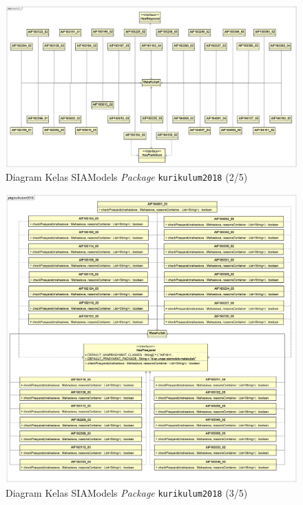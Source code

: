 \begin{figure}[H]
\centering
\includegraphics[scale=0.4]{Gambar/class-diagram-siamodels-mk-kurikulum-2018-1}
\caption{Diagram Kelas SIAModels \textit{Package} \texttt{kurikulum2018} (2/5)}
\label{fig:siamodels_class_2018_kurikulum_2}
\end{figure}

\begin{figure}[H]
\centering
\includegraphics[scale=0.15]{Gambar/class-diagram-siamodels-mk-kurikulum-2018-3}
\caption{Diagram Kelas SIAModels \textit{Package} \texttt{kurikulum2018} (3/5)}
\label{fig:siamodels_class_2018_kurikulum_3}
\end{figure}

